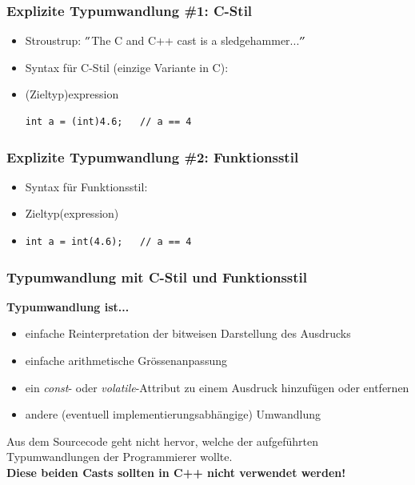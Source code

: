 \begin{minipage}{0.45\linewidth}
\subsubsection{Explizite Typumwandlung \#1: C-Stil}
\begin{itemize}
	\item Stroustrup: $"$The C and C++ cast is a sledgehammer...$"$
	\item Syntax für C-Stil (einzige Variante in C):
	\item[\-](Zieltyp)expression
\vspace{-\baselineskip}
\begin{minipage}{\linewidth}
\begin{lstlisting}
int a = (int)4.6;	// a == 4
\end{lstlisting}
\end{minipage}
\end{itemize}
\end{minipage}
\hspace{0.05\linewidth}
\begin{minipage}{0.45\linewidth}
\subsubsection{Explizite Typumwandlung \#2: Funktionsstil}
\begin{itemize}
	\item Syntax für Funktionsstil:
	\item[\-] Zieltyp(expression)
	\item[\-]
\vspace{-\baselineskip}
\begin{minipage}{\linewidth}
\begin{lstlisting}
int a = int(4.6);	// a == 4
\end{lstlisting}
\end{minipage}
\end{itemize}
\end{minipage}

\subsubsection{Typumwandlung mit C-Stil und Funktionsstil}
\textbf{Typumwandlung ist...}
\begin{itemize}
	\item einfache Reinterpretation der bitweisen Darstellung des Ausdrucks
	\item einfache arithmetische Grössenanpassung
	\item ein \emph{const}- oder \emph{volatile}-Attribut zu einem Ausdruck hinzufügen oder entfernen
	\item andere (eventuell implementierungsabhängige) Umwandlung
\end{itemize}
\begin{achtung}
Aus dem Sourcecode geht nicht hervor, welche der aufgeführten Typumwandlungen der Programmierer wollte.\\ 
\textbf{Diese beiden Casts sollten in C++ nicht verwendet werden!}
\end{achtung}


